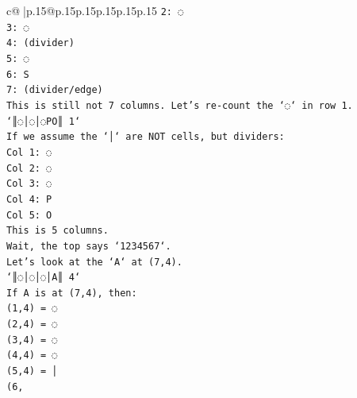 \documentclass{article}
\begin{document}
{\begin{supertabular}{c@{$\;$}|p{.15\linewidth}@{}p{.15\linewidth}p{.15\linewidth}p{.15\linewidth}p{.15\linewidth}p{.15\linewidth}}
{{{\texttt{2: ◌} \\
\texttt{3: ◌} \\
\texttt{4: (divider)} \\
\texttt{5: ◌} \\
\texttt{6: S} \\
\texttt{7: (divider/edge)} \\
\texttt{This is still not 7 columns. Let's re{-}count the `◌` in row 1.} \\
\texttt{`║◌│◌│◌PO║ 1`} \\
\texttt{If we assume the `│` are NOT cells, but dividers:} \\
\texttt{Col 1: ◌} \\
\texttt{Col 2: ◌} \\
\texttt{Col 3: ◌} \\
\texttt{Col 4: P} \\
\texttt{Col 5: O} \\
\texttt{This is 5 columns.} \\
\texttt{Wait, the top says `1234567`.} \\
\texttt{Let's look at the `A` at (7,4).} \\
\texttt{`║◌│◌│◌│A║ 4`} \\
\texttt{If A is at (7,4), then:} \\
\texttt{(1,4) = ◌} \\
\texttt{(2,4) = ◌} \\
\texttt{(3,4) = ◌} \\
\texttt{(4,4) = ◌} \\
\texttt{(5,4) = │} \\
\texttt{(6,} \\
            }
        }
    }
     \\ \\


\end{supertabular}}
\end{document}
